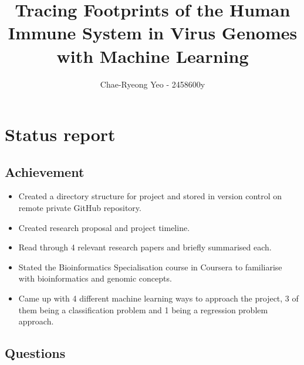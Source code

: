 \documentclass[11pt]{article}
\title{ {{Tracing Footprints of the Human Immune System in Virus Genomes with Machine Learning}} }
\author{ {{Chae-Ryeong Yeo}} - {{2458600y}} }
\begin{document}
    \maketitle
    
    
     

\section{Status report}

\subsection{Achievement}\label{proposal}

\begin{itemize}
\item Created a directory structure for project and stored in version control on remote private GitHub repository.
\item Created research proposal and project timeline.
\item Read through 4 relevant research papers and briefly summarised each.
\item Stated the Bioinformatics Specialisation course in Coursera to familiarise with bioinformatics and genomic concepts.
\item Came up with 4 different machine learning ways to approach the project, 3 of them being a classification problem and 1 being a regression problem approach.
\end{itemize}

\subsection{Questions}\label{progress}
\end{document}
